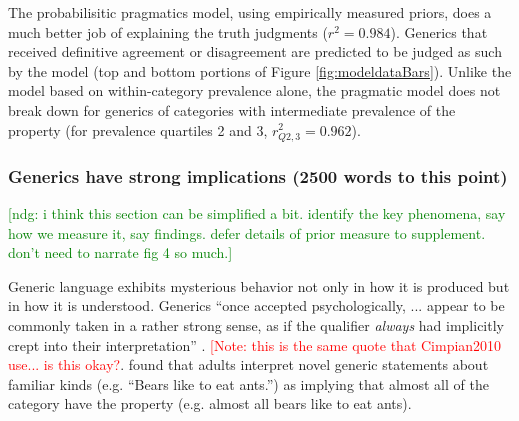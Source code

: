 \documentclass[10pt,letterpaper]{article}
\newcommand{\red}[1]{\textcolor{Red}{#1}}
\newcommand{\ndg}[1]{\textcolor{Green}{[ndg: #1]}}
\begin{document}

The probabilisitic pragmatics model, using empirically measured priors, does a much better job of explaining the truth judgments ($r^2=0.984$). 
Generics that received definitive agreement or disagreement are predicted to be judged as such by the model (top and bottom portions of Figure \ref{fig:modeldataBars}). Unlike the model based on within-category prevalence alone, the pragmatic model does not break down for generics of categories with intermediate prevalence of the property (for prevalence quartiles 2 and 3, $r_{Q2,3}^2=0.962$). 

\subsubsection{Generics have strong implications (2500 words to this point)} 

\ndg{i think this section can be simplified a bit. identify the key phenomena, say how we measure it, say findings. defer details of prior measure to supplement. don't need to narrate fig 4 so much.}

Generic language exhibits mysterious behavior not only in how it is produced but in how it is understood.
Generics ``once accepted psychologically, ... appear to be commonly taken in a rather strong sense, as if the qualifier \emph{always} had implicitly crept into their interpretation'' \cite{Abelson1966}. \red{[Note: this is the same quote that Cimpian2010 use... is this okay?}.
%
 found that adults interpret novel generic statements about familiar kinds (e.g. ``Bears like to eat ants.'') as implying that almost all of the category have the property (e.g. almost all bears like to eat ants).
\end{document}
